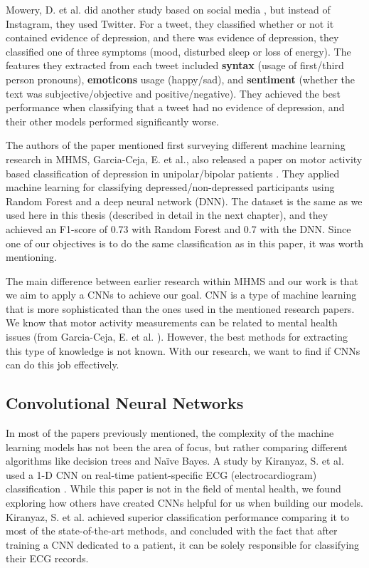 Mowery, D. et al. did another study based on social media \cite{twitter_depression}, but instead of Instagram, they used Twitter. For a tweet, they classified whether or not it contained evidence of depression, and there was evidence of depression, they classified one of three symptoms (mood, disturbed sleep or loss of energy). The features they extracted from each tweet included \textbf{syntax} (usage of first/third person pronouns), \textbf{emoticons} usage (happy/sad), and \textbf{sentiment} (whether the text was subjective/objective and positive/negative). They achieved the best performance when classifying that a tweet had no evidence of depression, and their other models performed significantly worse. 

The authors of the paper mentioned first surveying different machine learning research in MHMS, Garcia-Ceja, E. et al., also released a paper on motor activity based classification of depression in unipolar/bipolar patients \cite{GarciaCeja2018_classification_bipolar}. They applied machine learning for classifying depressed/non-depressed participants using Random Forest and a deep neural network (DNN). The dataset is the same as we used here in this thesis (described in detail in the next chapter), and they achieved an F1-score of 0.73 with Random Forest and 0.7 with the DNN. Since one of our objectives is to do the same classification as in this paper, it was worth mentioning.

The main difference between earlier research within MHMS and our work is that we aim to apply a CNNs to achieve our goal. CNN is a type of machine learning that is more sophisticated than the ones used in the mentioned research papers. We know that motor activity measurements can be related to mental health issues (from Garcia-Ceja, E. et al. \cite{GarciaCeja2018_classification_bipolar}). However, the best methods for extracting this type of knowledge is not known. With our research, we want to find if CNNs can do this job effectively.

\subsection{Convolutional Neural Networks}

In most of the papers previously mentioned, the complexity of the machine learning models has not been the area of focus, but rather comparing different algorithms like decision trees and Naïve Bayes. A study by Kiranyaz, S. et al. used a 1-D CNN on real-time patient-specific ECG (electrocardiogram) classification \cite{ecg_1d_conv}. While this paper is not in the field of mental health, we found exploring how others have created CNNs helpful for us when building our models. Kiranyaz, S. et al. achieved superior classification performance comparing it to most of the state-of-the-art methods, and concluded with the fact that after training a CNN dedicated to a patient, it can be solely responsible for classifying their ECG records.

